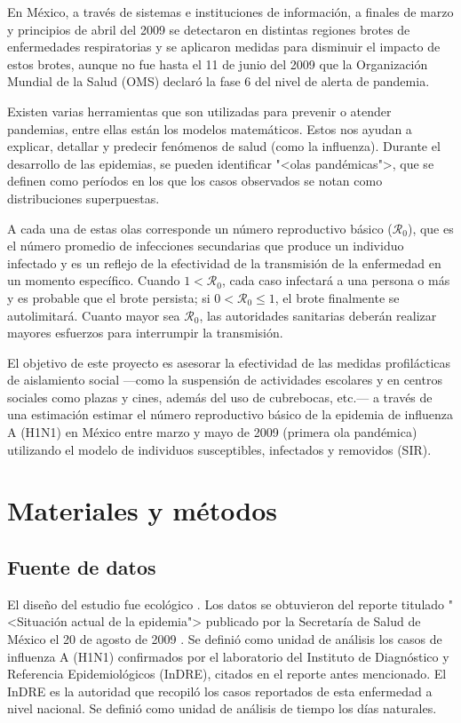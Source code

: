 \documentclass[12pt]{article}
\begin{document}
	En México, a través de sistemas e instituciones de información, a finales de marzo y principios de abril del 2009 se detectaron en distintas regiones brotes de enfermedades respiratorias y se aplicaron medidas para disminuir el impacto de estos brotes, aunque no fue hasta el 11 de junio del 2009 que la Organización Mundial de la Salud (OMS) declaró la fase 6 del nivel de alerta de pandemia.
	
	Existen varias herramientas que son utilizadas para prevenir o atender pandemias, entre ellas están los modelos matemáticos. Estos nos ayudan a explicar, detallar y predecir fenómenos de salud (como la influenza). Durante el desarrollo
	de las epidemias, se pueden identificar "<olas pandémicas">, que se definen como períodos en los que los casos observados se notan como distribuciones superpuestas.
	
	A cada una de estas olas corresponde un número reproductivo básico ($\mathcal{R}_0$), que es el número promedio de infecciones secundarias que produce un individuo infectado y es un reflejo de la efectividad de la transmisión de la enfermedad en un momento específico. Cuando $ 1 < \mathcal{R}_0 $, cada caso infectará a una persona o más y es
	probable que el brote persista; si $ 0 < \mathcal{R}_0 \leq 1 $, el brote finalmente se autolimitará. Cuanto mayor sea $ \mathcal{R}_0 $, las autoridades sanitarias deberán realizar mayores esfuerzos para interrumpir la transmisión.
	
	El objetivo de este proyecto es asesorar la efectividad de las medidas profilácticas de aislamiento social ---como la suspensión de actividades escolares y en centros sociales como plazas y cines, además del uso de cubrebocas, etc.---	a través de una estimación estimar el número reproductivo básico de la epidemia de influenza A (H1N1) en México entre marzo y mayo de 2009 (primera ola pandémica) utilizando el modelo de individuos susceptibles, infectados y removidos (SIR).
	
	\section{Materiales y métodos}
	\subsection*{Fuente de datos}
	
	El diseño del estudio fue ecológico \cite{VillaRomero2012}. Los datos se obtuvieron del reporte titulado "<Situación actual de la epidemia"> publicado por la Secretaría de Salud de México el 20 de agosto de 2009 \cite{Salud2009}. Se definió como unidad de análisis los casos de influenza A (H1N1) confirmados por el laboratorio del Instituto de Diagnóstico y Referencia Epidemiológicos (InDRE), citados en el reporte antes mencionado. El InDRE es la autoridad que recopiló los casos reportados de esta enfermedad a nivel nacional. Se definió como unidad de análisis de tiempo los días naturales.
	
\end{document}
